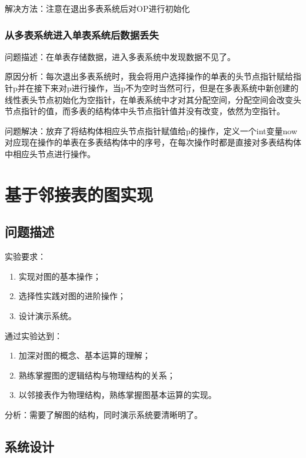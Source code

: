 \documentclass[supercite]{Experimental_Report}
\theoremstyle{definition}
\begin{document}
解决方法：注意在退出多表系统后对OP进行初始化\par
\subsubsection{从多表系统进入单表系统后数据丢失}
	问题描述：在单表存储数据，进入多表系统中发现数据不见了。\par
	原因分析：每次退出多表系统时，我会将用户选择操作的单表的头节点指针赋给指针p并在接下来对p进行操作，当p不为空时当然可行，但是在多表系统中新创建的线性表头节点初始化为空指针，在单表系统中才对其分配空间，分配空间会改变头节点指针的值，而多表的结构体中头节点指针值并没有改变，依然为空指针。\par
	问题解决：放弃了将结构体相应头节点指针赋值给p的操作，定义一个int变量now对应现在操作的单表在多表结构体中的序号，在每次操作时都是直接对多表结构体中相应头节点进行操作。\par
	
\clearpage

\section{基于邻接表的图实现}
\subsection{问题描述}
\noindent 实验要求：
\begin{enumerate}
	\item 实现对图的基本操作；
	\item 选择性实践对图的进阶操作；
	\item 设计演示系统。
\end{enumerate}
通过实验达到：
\begin{enumerate}
	\item 加深对图的概念、基本运算的理解；	
	\item 熟练掌握图的逻辑结构与物理结构的关系；
	\item 以邻接表作为物理结构，熟练掌握图基本运算的实现。
\end{enumerate}
分析：需要了解图的结构，同时演示系统要清晰明了。

\subsection{系统设计}
\end{document}

